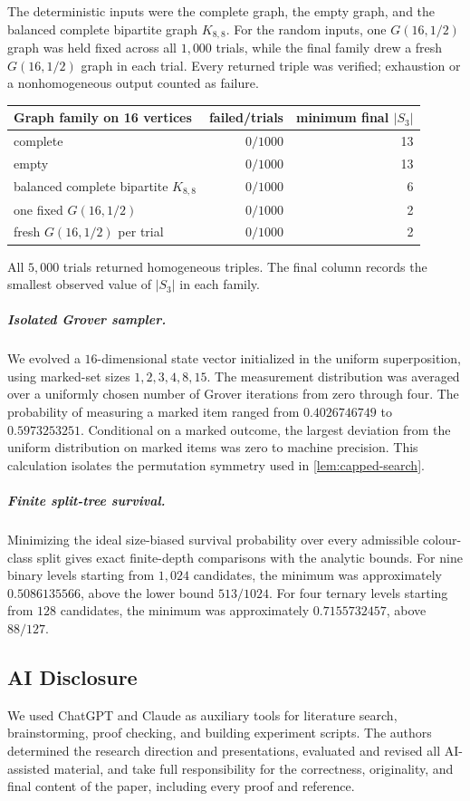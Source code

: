 The deterministic inputs were the complete graph, the empty graph, and the
balanced complete bipartite graph $K_{8,8}$.  For the random inputs, one
$G(16,1/2)$ graph was held fixed across all $1{,}000$ trials, while the final
family drew a fresh $G(16,1/2)$ graph in each trial.  Every returned triple was
verified; exhaustion or a nonhomogeneous output counted as failure.

\begin{center}
\begin{tabular}{lrr}
\hline
Graph family on 16 vertices & failed/trials & minimum final $|S_3|$\\
\hline
complete & $0/1000$ & 13\\
empty & $0/1000$ & 13\\
balanced complete bipartite $K_{8,8}$ & $0/1000$ & 6\\
one fixed $G(16,1/2)$ & $0/1000$ & 2\\
fresh $G(16,1/2)$ per trial & $0/1000$ & 2\\
\hline
\end{tabular}
\end{center}

All $5{,}000$ trials returned homogeneous triples.  The final column records
the smallest observed value of $|S_3|$ in each family.

\subparagraph*{Isolated Grover sampler.}
We evolved a $16$-dimensional state vector initialized in the uniform
superposition, using marked-set sizes $1,2,3,4,8,15$.  The measurement
distribution was averaged over a uniformly chosen number of Grover iterations
from zero through four.  The probability of measuring a marked item ranged
from $0.4026746749$ to $0.5973253251$.  Conditional on a marked outcome, the
largest deviation from the uniform distribution on marked items was zero to
machine precision.  This calculation isolates the permutation symmetry used
in \cref{lem:capped-search}.

\subparagraph*{Finite split-tree survival.}
Minimizing the ideal size-biased survival probability over every admissible
colour-class split gives exact finite-depth comparisons with the analytic
bounds.  For nine binary levels starting from $1{,}024$ candidates, the
minimum was approximately $0.5086135566$, above the lower bound $513/1024$.
For four ternary levels starting from $128$ candidates, the minimum was
approximately $0.7155732457$, above $88/127$.

\subsection{AI Disclosure}
\label{app:ai-disclosure}

We used ChatGPT and Claude as auxiliary tools for literature search,
brainstorming, proof checking, and building experiment scripts.  The authors
determined the research direction and presentations, evaluated and revised
all AI-assisted material, and take full responsibility for the correctness,
originality, and final content of the paper, including every proof and
reference.
